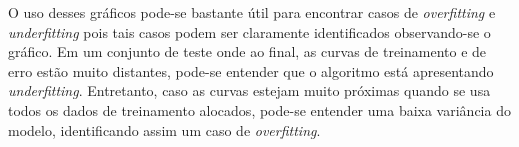 O uso desses gráficos pode-se bastante útil para encontrar casos de \textit{overfitting}
e \textit{underfitting} pois tais casos podem ser claramente identificados observando-se
o gráfico. Em um conjunto de teste onde ao final, as curvas de treinamento e de erro estão
muito distantes, pode-se entender que o algoritmo está apresentando \textit{underfitting}.
Entretanto, caso as curvas estejam muito próximas quando se usa todos os dados de
treinamento alocados, pode-se entender uma baixa variância do modelo, identificando assim
um caso de \textit{overfitting}.
